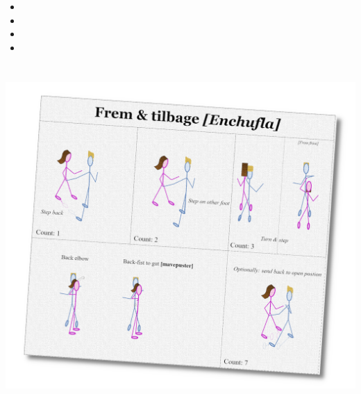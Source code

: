 \begin{itemize}
  \item \attsvinger 
  \item {} 
  \item \attlosser
  \item \atthestehilsen
\end{itemize}

\pagebreak{}
\section*{\Sovsenchufla [\Salsaenchufla]}
\begin{center}
\includegraphics[scale=0.15]{02-Description/diagram-enchufla-present}
\end{center}


